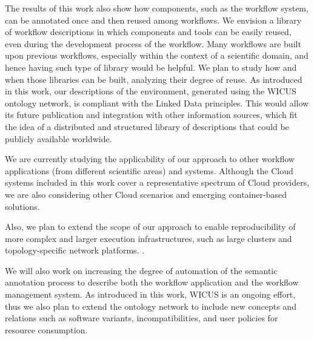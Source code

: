 The results of this work also show how components, such as the workflow 
system, can be annotated once and then reused among workflows. We 
envision a library of workflow descriptions in which components and tools 
can be easily reused, even during the development process of the workflow. 
Many workflows are built upon previous workflows, especially within the 
context of a scientific domain, and hence having such type of library would 
be helpful. We plan to study how and when those libraries can be built, 
analyzing their degree of reuse. As introduced in this work, our 
descriptions of the environment, generated using the WICUS ontology 
network, is compliant with the Linked Data principles. This would allow its 
future publication and integration with other information sources, which fit 
the idea of a distributed and structured library of descriptions that could be 
publicly available worldwide.

We are currently studying the applicability of our approach to other 
workflow applications (from different scientific areas) and systems. Although
the Cloud systems included in this work cover a representative spectrum of 
Cloud providers, we are also considering other Cloud scenarios and 
emerging container-based solutions. 

Also, we plan to extend the scope of our approach to enable reproducibility of 
more complex and larger execution infrastructures, such as large clusters and topology-specific 
network platforms. .

We will also work on increasing  the degree of automation of the semantic annotation process to describe both the workflow application and the workflow management system. As introduced in this work, WICUS is an ongoing effort, thus we also plan to extend the ontology network to include new concepts and relations such as software variants, incompatibilities, and user policies for resource consumption.




